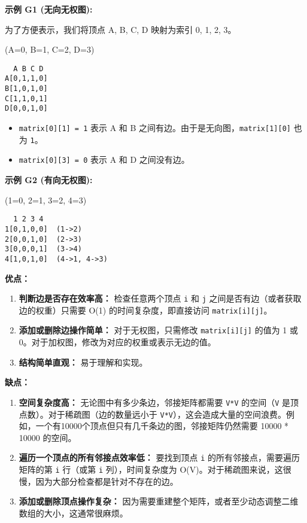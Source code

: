 \textbf{示例 G1 (无向无权图):}

为了方便表示，我们将顶点 A, B, C, D 映射为索引 0, 1, 2, 3。

(A=0, B=1, C=2, D=3)

\begin{lstlisting}
  A B C D
A[0,1,1,0]
B[1,0,1,0]
C[1,1,0,1]
D[0,0,1,0]
\end{lstlisting}
\begin{itemize}
	\item \lstinline{matrix[0][1] = 1} 表示 A 和 B 之间有边。由于是无向图，\lstinline{matrix[1][0]} 也为 \lstinline{1}。
	\item \lstinline{matrix[0][3] = 0} 表示 A 和 D 之间没有边。
\end{itemize}

\textbf{示例 G2 (有向无权图):}

(1=0, 2=1, 3=2, 4=3)

\begin{lstlisting}
  1 2 3 4
1[0,1,0,0]  (1->2)
2[0,0,1,0]  (2->3)
3[0,0,0,1]  (3->4)
4[1,0,1,0]  (4->1, 4->3)
\end{lstlisting}
\textbf{优点：}

\begin{enumerate}
	\item \textbf{判断边是否存在效率高：} 检查任意两个顶点 \lstinline{i} 和 \lstinline{j} 之间是否有边（或者获取边的权重）只需要 O(1) 的时间复杂度，即直接访问 \lstinline{matrix[i][j]}。
	\item \textbf{添加或删除边操作简单：} 对于无权图，只需修改 \lstinline{matrix[i][j]} 的值为 1 或 0。对于加权图，修改为对应的权重或表示无边的值。
	\item \textbf{结构简单直观：} 易于理解和实现。
\end{enumerate}

\textbf{缺点：}

\begin{enumerate}
	\item \textbf{空间复杂度高：} 无论图中有多少条边，邻接矩阵都需要 \lstinline{V*V} 的空间（\lstinline{V} 是顶点数）。对于稀疏图（边的数量远小于 \lstinline{V*V}），这会造成大量的空间浪费。例如，一个有10000个顶点但只有几千条边的图，邻接矩阵仍然需要 10000 * 10000 的空间。
	\item \textbf{遍历一个顶点的所有邻接点效率低：} 要找到顶点 \lstinline{i} 的所有邻接点，需要遍历矩阵的第 \lstinline{i} 行（或第 \lstinline{i} 列），时间复杂度为 O(V)。对于稀疏图来说，这很慢，因为大部分检查都是针对不存在的边。
	\item \textbf{添加或删除顶点操作复杂：} 因为需要重建整个矩阵，或者至少动态调整二维数组的大小，这通常很麻烦。
\end{enumerate}


